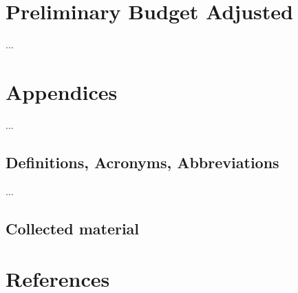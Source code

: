 \documentclass[]{article}
\begin{document}
\section{Preliminary Budget Adjusted}
... 
\section{Appendices}
... 
\subsection{Definitions, Acronyms, Abbreviations}
... 
\subsection{Collected material}

\section {References}



\end{document}
